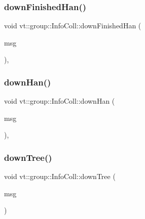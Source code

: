 \mbox{\label{structvt_1_1group_1_1_info_coll_ac932b886b6e0beac88966f0f0edae68a}} 
\subsubsection{\texorpdfstring{down\+Finished\+Han()}{downFinishedHan()}}
{\footnotesize\ttfamily void vt\+::group\+::\+Info\+Coll\+::down\+Finished\+Han (\begin{DoxyParamCaption}\item[{\hyperlink{namespacevt_1_1group_a864fcf6bc821eacf8350bf4ad15e51b3}{Group\+Only\+Msg} $\ast$}]{msg }\end{DoxyParamCaption})\hspace{0.3cm}{\ttfamily [static]}, {\ttfamily [protected]}}

\mbox{\label{structvt_1_1group_1_1_info_coll_a39c744a7ce406b9e14173aef499c6458}} 
\subsubsection{\texorpdfstring{down\+Han()}{downHan()}}
{\footnotesize\ttfamily void vt\+::group\+::\+Info\+Coll\+::down\+Han (\begin{DoxyParamCaption}\item[{\hyperlink{namespacevt_1_1group_a4c1183efe0185992fefb3ab38a55a8a7}{Group\+Collective\+Msg} $\ast$}]{msg }\end{DoxyParamCaption})\hspace{0.3cm}{\ttfamily [static]}, {\ttfamily [protected]}}

\mbox{\label{structvt_1_1group_1_1_info_coll_af0b3b5babeed07eab4d462a0adf5fe2b}} 
\subsubsection{\texorpdfstring{down\+Tree()}{downTree()}}
{\footnotesize\ttfamily void vt\+::group\+::\+Info\+Coll\+::down\+Tree (\begin{DoxyParamCaption}\item[{\hyperlink{namespacevt_1_1group_a4c1183efe0185992fefb3ab38a55a8a7}{Group\+Collective\+Msg} $\ast$}]{msg }\end{DoxyParamCaption})\hspace{0.3cm}{\ttfamily [private]}}

